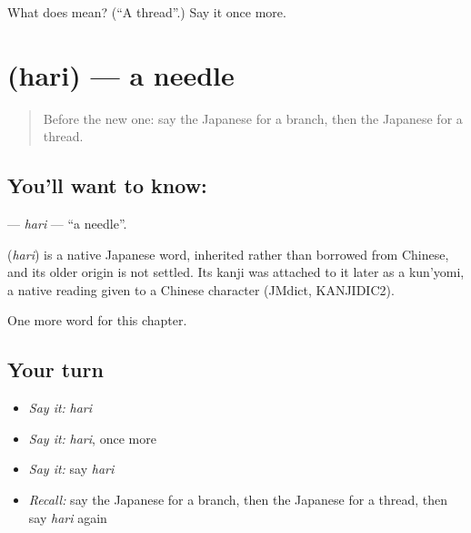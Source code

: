 \begin{tcolorbox}[breakable,colback=teal!4,colframe=teal!35!black,title={Before you move on}]
What does  mean? (\textquotedblleft{}A thread\textquotedblright{}.) Say it once more.
\end{tcolorbox}
\section[\texorpdfstring{\ja{はり} (hari)}{はり (hari)}]{ (hari) — a needle}

\label{lesson:JA-C61-hari}



\begin{quote}
Before the new one: say the Japanese for a branch, then the Japanese for a thread.
\end{quote}

\subsection*{You'll want to know: }
\textbf{} — \emph{hari} — \textquotedblleft{}a needle\textquotedblright{}.

\begin{cousinweb}
\textbf{} (\emph{hari}) is a native Japanese word, inherited rather than borrowed from Chinese, and its older origin is not settled. Its kanji was attached to it later as a kun'yomi, a native reading given to a Chinese character (JMdict, KANJIDIC2).
\end{cousinweb}

\begin{grammarlens}[title={What you've built}]
One more word for this chapter.
\end{grammarlens}

\subsection*{Your turn}
\begin{itemize}
\raggedright
  \item \emph{Say it:} \emph{hari}
  \item \emph{Say it:} \emph{hari}, once more
  \item \emph{Say it:} say \emph{hari}
  \item \emph{Recall:} say the Japanese for a branch, then the Japanese for a thread, then say \emph{hari} again
\end{itemize}

